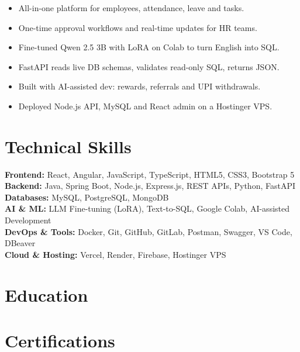 \documentclass[]{deedy-resume-openfont}
\renewcommand{\sectionsep}{\vspace{6pt}}
\begin{document}
\begin{itemize}
  \item All-in-one platform for employees, attendance, leave and tasks.
  \item One-time approval workflows and real-time updates for HR teams.
\end{itemize}
\sectionsep

\begin{itemize}
  \item Fine-tuned Qwen 2.5 3B with LoRA on Colab to turn English into SQL.
  \item FastAPI reads live DB schemas, validates read-only SQL, returns JSON.
\end{itemize}
\sectionsep

\begin{itemize}
  \item Built with AI-assisted dev: rewards, referrals and UPI withdrawals.
  \item Deployed Node.js API, MySQL and React admin on a Hostinger VPS.
\end{itemize}
\sectionsep

\section{Technical Skills}
\textbf{Frontend:} React, Angular, JavaScript, TypeScript, HTML5, CSS3, Bootstrap 5 \\
\textbf{Backend:} Java, Spring Boot, Node.js, Express.js, REST APIs, Python, FastAPI \\
\textbf{Databases:} MySQL, PostgreSQL, MongoDB \\
\textbf{AI \& ML:} LLM Fine-tuning (LoRA), Text-to-SQL, Google Colab, AI-assisted Development \\
\textbf{DevOps \& Tools:} Docker, Git, GitHub, GitLab, Postman, Swagger, VS Code, DBeaver \\
\textbf{Cloud \& Hosting:} Vercel, Render, Firebase, Hostinger VPS
\sectionsep

\section{Education}
\vspace{3pt}
\sectionsep

\section{Certifications}
\end{document}
